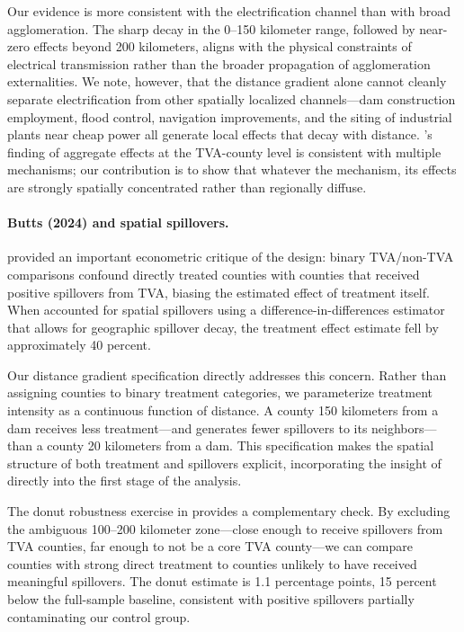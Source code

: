 \documentclass[12pt]{article}
\begin{document}
Our evidence is more consistent with the electrification channel than with broad agglomeration. The sharp decay in the 0--150 kilometer range, followed by near-zero effects beyond 200 kilometers, aligns with the physical constraints of electrical transmission rather than the broader propagation of agglomeration externalities. We note, however, that the distance gradient alone cannot cleanly separate electrification from other spatially localized channels---dam construction employment, flood control, navigation improvements, and the siting of industrial plants near cheap power all generate local effects that decay with distance. \citet{kline2014}'s finding of aggregate effects at the TVA-county level is consistent with multiple mechanisms; our contribution is to show that whatever the mechanism, its effects are strongly spatially concentrated rather than regionally diffuse.

\paragraph{Butts (2024) and spatial spillovers.} \citet{butts2024} provided an important econometric critique of the \citet{kline2014} design: binary TVA/non-TVA comparisons confound directly treated counties with counties that received positive spillovers from TVA, biasing the estimated effect of treatment itself. When \citeauthor{butts2024} accounted for spatial spillovers using a difference-in-differences estimator that allows for geographic spillover decay, the treatment effect estimate fell by approximately 40 percent.

Our distance gradient specification directly addresses this concern. Rather than assigning counties to binary treatment categories, we parameterize treatment intensity as a continuous function of distance. A county 150 kilometers from a dam receives less treatment---and generates fewer spillovers to its neighbors---than a county 20 kilometers from a dam. This specification makes the spatial structure of both treatment and spillovers explicit, incorporating the insight of \citeauthor{butts2024} directly into the first stage of the analysis.

The donut robustness exercise in  provides a complementary check. By excluding the ambiguous 100--200 kilometer zone---close enough to receive spillovers from TVA counties, far enough to not be a core TVA county---we can compare counties with strong direct treatment to counties unlikely to have received meaningful spillovers. The donut estimate is 1.1 percentage points, 15 percent below the full-sample baseline, consistent with positive spillovers partially contaminating our control group.
\end{document}
